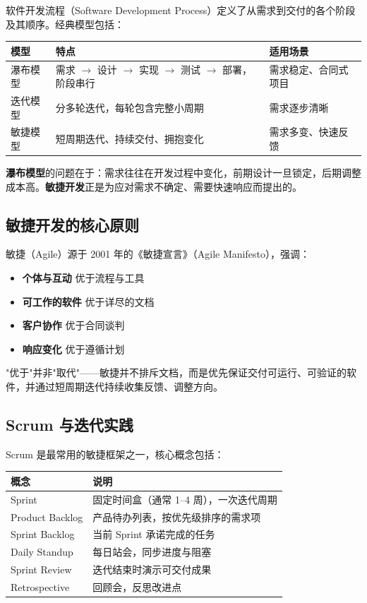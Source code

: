 \documentclass[11pt]{article}
\begin{document}
软件开发流程（Software Development Process）定义了从需求到交付的各个阶段及其顺序。经典模型包括：

\begin{center}
\begin{tabular}{|l|l|l|}
\hline
\textbf{模型} & \textbf{特点} & \textbf{适用场景} \\
\hline
瀑布模型 & 需求 $\rightarrow$ 设计 $\rightarrow$ 实现 $\rightarrow$ 测试 $\rightarrow$ 部署，阶段串行 & 需求稳定、合同式项目 \\
\hline
迭代模型 & 分多轮迭代，每轮包含完整小周期 & 需求逐步清晰 \\
\hline
敏捷模型 & 短周期迭代、持续交付、拥抱变化 & 需求多变、快速反馈 \\
\hline
\end{tabular}
\end{center}

\textbf{瀑布模型}的问题在于：需求往往在开发过程中变化，前期设计一旦锁定，后期调整成本高。\textbf{敏捷开发}正是为应对需求不确定、需要快速响应而提出的。

\subsection{敏捷开发的核心原则}

敏捷（Agile）源于 2001 年的《敏捷宣言》（Agile Manifesto），强调：

\begin{itemize}
    \item \textbf{个体与互动} 优于流程与工具
    \item \textbf{可工作的软件} 优于详尽的文档
    \item \textbf{客户协作} 优于合同谈判
    \item \textbf{响应变化} 优于遵循计划
\end{itemize}

"优于"并非"取代"——敏捷并不排斥文档，而是优先保证交付可运行、可验证的软件，并通过短周期迭代持续收集反馈、调整方向。

\subsection{Scrum 与迭代实践}

Scrum 是最常用的敏捷框架之一，核心概念包括：

\begin{center}
\begin{tabular}{|l|l|}
\hline
\textbf{概念} & \textbf{说明} \\
\hline
Sprint & 固定时间盒（通常 1--4 周），一次迭代周期 \\
\hline
Product Backlog & 产品待办列表，按优先级排序的需求项 \\
\hline
Sprint Backlog & 当前 Sprint 承诺完成的任务 \\
\hline
Daily Standup & 每日站会，同步进度与阻塞 \\
\hline
Sprint Review & 迭代结束时演示可交付成果 \\
\hline
Retrospective & 回顾会，反思改进点 \\
\hline
\end{tabular}
\end{center}
\end{document}
